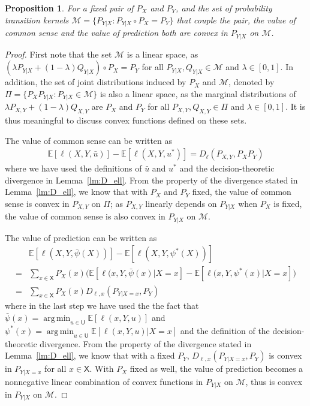 \documentclass[10pt,a4paper]{amsart}
\newtheorem{proposition}{Proposition}
\newcommand{\E}{\mathbb{E}}
\DeclareMathOperator*{\argmin}{arg\,min}
\def\sU{{\mathsf U}}
\def\sX{{\mathsf X}}
\begin{document}
\begin{proposition}\label{prop:vo_coms_pred}
For a fixed pair of $P_X$ and $P_Y$, and the set of probability transition kernels $\mathcal{M}=\{P_{Y|X}:P_{Y|X}\circ P_X = P_Y\}$ that couple the pair, the value of common sense and the value of prediction both are convex in $P_{Y|X}$ on $\mathcal{M}$.
\end{proposition}

\begin{proof}
First note that the set $\mathcal{M}$ is a linear space, as $(\lambda P_{Y|X} + (1-\lambda)Q_{Y|X})\circ P_{X} = P_Y$ for all $P_{Y|X}, Q_{Y|X}\in \mathcal{M}$ and $\lambda\in[0,1]$.
In addition, the set of joint distributions induced by $P_X$ and $\mathcal{M}$, denoted by $\Pi = \{P_X P_{Y|X}: P_{Y|X}\in\mathcal{M}\}$ is also a linear space, as the marginal distributions of $\lambda P_{X,Y} + (1-\lambda)Q_{X,Y}$ are $P_X$ and $P_Y$ for all $P_{X,Y}, Q_{X,Y}\in {\Pi}$ and $\lambda\in[0,1]$.
It is thus meaningful to discuss convex functions defined on these sets.

The value of common sense can be written as
\begin{align}
\E[\ell(X,Y,\bar u)] - \E[\ell(X,Y,u^*)]  
=   D_{\ell}(P_{X,Y}, P_X P_Y) 
\end{align}
where we have used the definitions of $\bar u$ and $u^*$ and the decision-theoretic divergence in Lemma~\ref{lm:D_ell}.
From the property of the divergence stated in Lemma~\ref{lm:D_ell}, we know that with $P_X$ and $P_Y$ fixed, the value of common sense is convex in $P_{X,Y}$ on $\Pi$; as $P_{X,Y}$ linearly depends on $P_{Y|X}$ when $P_X$ is fixed, the value of common sense is also convex in $P_{Y|X}$ on $\mathcal M$.

The value of prediction can be written as
\begin{align}
& \E[\ell(X,Y,\bar\psi(X))] - \E[\ell(X,Y,\psi^*(X))]  \nonumber \\
= & \sum_{x\in\sX} P_X(x)  \big( \E[\ell(x,Y,\bar\psi(x)|X=x] - \E[\ell(x,Y,\psi^*(x)|X=x] \big) \\
= & \sum_{x\in\sX} P_X(x)  D_{\ell,x}(P_{Y|X=x}, P_Y) 
\end{align}
where in the last step we have used the the fact that $\bar \psi(x) = \argmin_{u\in\sU}  \E[\ell(x,Y,u)]$ and $\psi^*(x) = \argmin_{u\in\sU}  \E[\ell(x,Y,u)|X=x]$ and the definition of the decision-theoretic divergence.
From the property of the divergence stated in Lemma~\ref{lm:D_ell}, we know that with a fixed $P_Y$, $D_{\ell,x}(P_{Y|X=x}, P_Y)$ is convex in $P_{Y|X=x}$ for all $x\in\sX$.
With $P_X$ fixed as well, the value of prediction becomes a nonnegative linear combination of convex functions in $P_{Y|X}$ on $\mathcal{M}$, thus is convex in $P_{Y|X}$ on $\mathcal{M}$.
\end{proof}
\end{document}
